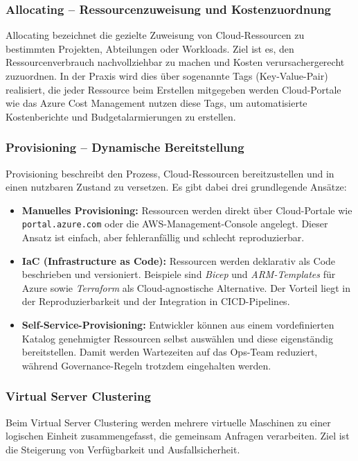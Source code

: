 \subsubsection{Allocating -- Ressourcenzuweisung und Kostenzuordnung}
Allocating bezeichnet die gezielte Zuweisung von Cloud-Ressourcen zu bestimmten
Projekten, Abteilungen oder Workloads. Ziel ist es, den Ressourcenverbrauch
nachvollziehbar zu machen und Kosten verursachergerecht zuzuordnen.
In der Praxis wird dies über sogenannte Tags (Key-Value-Pair)
realisiert, die jeder Ressource beim Erstellen mitgegeben werden
Cloud-Portale wie das Azure Cost Management nutzen diese Tags, um automatisierte
Kostenberichte und Budgetalarmierungen zu erstellen.
\subsubsection{Provisioning -- Dynamische Bereitstellung}
Provisioning beschreibt den Prozess, Cloud-Ressourcen bereitzustellen und in
einen nutzbaren Zustand zu versetzen. Es gibt dabei drei grundlegende Ansätze:

\begin{itemize}
    \item \textbf{Manuelles Provisioning:} Ressourcen werden direkt über
    Cloud-Portale wie \texttt{portal.azure.com} oder die AWS-Management-Console
    angelegt. Dieser Ansatz ist einfach, aber fehleranfällig und schlecht
    reproduzierbar.

    \item \textbf{IaC (Infrastructure as Code):} Ressourcen werden
    deklarativ als Code beschrieben und versioniert. Beispiele sind
    \textit{Bicep} und \textit{ARM-Templates} für Azure sowie
    \textit{Terraform} als Cloud-agnostische Alternative. Der Vorteil liegt in
    der Reproduzierbarkeit und der Integration in CICD-Pipelines.

    \item \textbf{Self-Service-Provisioning:} Entwickler können aus einem
    vordefinierten Katalog genehmigter Ressourcen selbst auswählen und diese
    eigenständig bereitstellen. Damit werden Wartezeiten auf das Ops-Team
    reduziert, während Governance-Regeln trotzdem eingehalten werden.
\end{itemize}

\subsubsection{Virtual Server Clustering}
Beim Virtual Server Clustering werden mehrere virtuelle Maschinen zu einer
logischen Einheit zusammengefasst, die gemeinsam Anfragen verarbeiten.
Ziel ist die Steigerung von Verfügbarkeit und Ausfallsicherheit.

